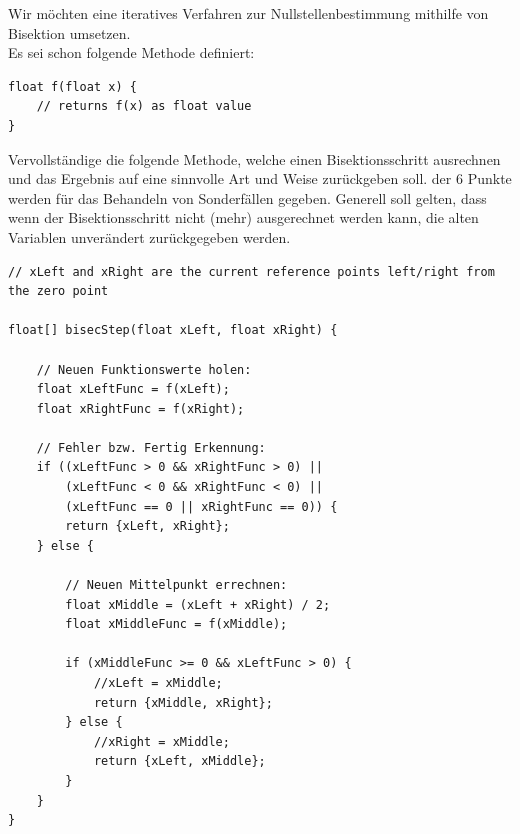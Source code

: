 \documentclass{scrartcl}
\begin{document}
Wir möchten eine iteratives Verfahren zur Nullstellenbestimmung mithilfe von Bisektion umsetzen. \\
Es sei schon folgende Methode definiert:
\begin{lstlisting}
float f(float x) {
	// returns f(x) as float value
}
\end{lstlisting}
\lbreak
Vervollständige die folgende Methode, welche einen Bisektionsschritt ausrechnen und das Ergebnis auf eine sinnvolle Art und Weise zurückgeben soll.  der 6 Punkte werden für das Behandeln von Sonderfällen gegeben. Generell soll gelten, dass wenn der Bisektionsschritt nicht (mehr) ausgerechnet werden kann, die alten Variablen unverändert zurückgegeben werden.
\\
\begin{lstlisting}
// xLeft and xRight are the current reference points left/right from the zero point

float[] bisecStep(float xLeft, float xRight) {

	// Neuen Funktionswerte holen:
	float xLeftFunc = f(xLeft);
	float xRightFunc = f(xRight);
	
	// Fehler bzw. Fertig Erkennung:
	if ((xLeftFunc > 0 && xRightFunc > 0) ||
		(xLeftFunc < 0 && xRightFunc < 0) ||
		(xLeftFunc == 0 || xRightFunc == 0)) {
		return {xLeft, xRight};
	} else {
	
		// Neuen Mittelpunkt errechnen:
		float xMiddle = (xLeft + xRight) / 2;
		float xMiddleFunc = f(xMiddle);
		
		if (xMiddleFunc >= 0 && xLeftFunc > 0) {
			//xLeft = xMiddle;
			return {xMiddle, xRight};
		} else {
			//xRight = xMiddle;
			return {xLeft, xMiddle};
		}
	}
}
\end{lstlisting}
\end{document}
